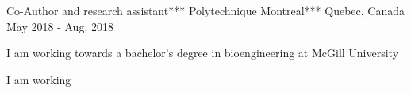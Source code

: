 \begin{cventries}
  \cventry
    {Co-Author and research assistant***}
    {Polytechnique Montreal***}
    {Quebec, Canada}
    {May 2018 - Aug. 2018}
    {
      \begin{cvitems}
        \item {I am working towards a bachelor's degree in bioengineering at McGill University}
        \item {I am working}
      \end{cvitems}
    }
\end{cventries}